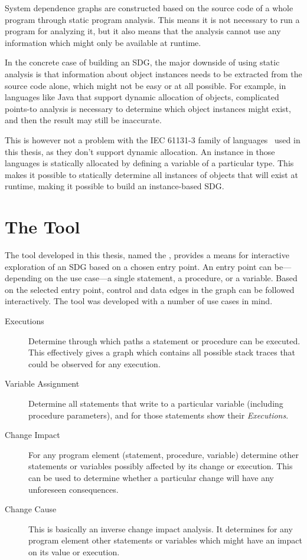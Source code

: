 System dependence graphs are constructed based on the source code of a whole program through static program analysis. 
This means it is not necessary to run a program for analyzing it, but it also means that the analysis cannot use any 
information which might only be available at runtime.

In the concrete case of building an SDG, the major downside of using static analysis is that information about object 
instances needs to be extracted from the source code alone, which might not be easy or at all possible. For example, in 
languages like Java that support dynamic allocation of objects, complicated points-to analysis is necessary to 
determine which object instances might exist, and then the result may still be inaccurate.

This is however not a problem with the IEC 61131-3 family of languages~\cite{IEC61131:2003} used in this thesis, as 
they don't support dynamic allocation. An instance in those languages is statically allocated by defining a variable of 
a particular type. This makes it possible to statically determine all instances of objects that will exist at runtime, 
making it possible to build an instance-based SDG.


\section{The Tool}

The tool developed in this thesis, named the \emph{\SB}, provides a means for interactive exploration of an SDG based 
on a chosen entry point. An entry point can be---depending on the use case---a single statement, a procedure, or a 
variable. Based on the selected entry point, control and data edges in the graph can be followed interactively. The 
tool was developed with a number of use cases in mind.

\begin{description}
  \item[Executions] Determine through which paths a statement or procedure can be executed. This effectively gives a 
  graph which contains all possible stack traces that could be observed for any execution.
  
  \item[Variable Assignment] Determine all statements that write to a particular variable (including procedure 
  parameters), and for those statements show their \emph{Executions}.
  
  \item[Change Impact] For any program element (statement, procedure, variable) determine other statements or variables 
  possibly affected by its change or execution. This can be used to determine whether a particular change will have any 
  unforeseen consequences.
  
  \item[Change Cause] This is basically an inverse change impact analysis. It determines for any program element
  other statements or variables which might have an impact on its value or execution.
\end{description}

